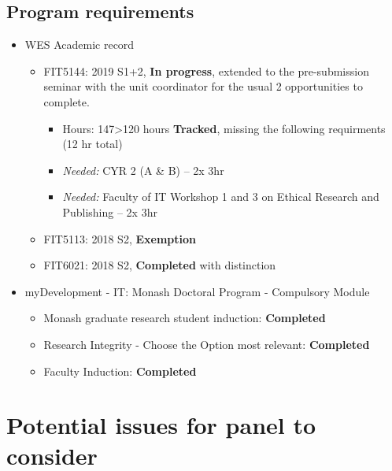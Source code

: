 \documentclass[11,]{article}
\providecommand{\tightlist}{%
  \setlength{\itemsep}{0pt}\setlength{\parskip}{0pt}}
\begin{document}
\hypertarget{program-requirements}{%
\subsection{Program requirements}\label{program-requirements}}

\begin{itemize}
\tightlist
\item
  WES Academic record

  \begin{itemize}
  \tightlist
  \item
    FIT5144: 2019 S1+2, \textbf{In progress}, extended to the pre-submission seminar with the unit coordinator for the usual 2 opportunities to complete.

    \begin{itemize}
    \tightlist
    \item
      Hours: 147\textgreater120 hours \textbf{Tracked}, missing the following requirments (12 hr total)
    \item
      \emph{Needed:} CYR 2 (A \& B) -- 2x 3hr
    \item
      \emph{Needed:} Faculty of IT Workshop 1 and 3 on Ethical Research and Publishing -- 2x 3hr
    \end{itemize}
  \item
    FIT5113: 2018 S2, \textbf{Exemption}
  \item
    FIT6021: 2018 S2, \textbf{Completed} with distinction
  \end{itemize}
\item
  myDevelopment - IT: Monash Doctoral Program - Compulsory Module

  \begin{itemize}
  \tightlist
  \item
    Monash graduate research student induction: \textbf{Completed}
  \item
    Research Integrity - Choose the Option most relevant: \textbf{Completed}
  \item
    Faculty Induction: \textbf{Completed}
  \end{itemize}
\end{itemize}

\hypertarget{potential-issues-for-panel-to-consider}{%
\section{Potential issues for panel to consider}\label{potential-issues-for-panel-to-consider}}
\end{document}

